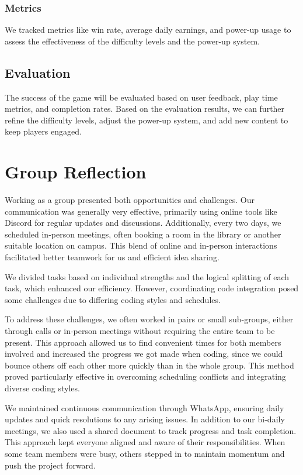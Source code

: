 \documentclass[9pt,a4paper,twoside]{tau-class/tau}
\begin{document}
    \subsubsection{Metrics}
    We tracked metrics like win rate, average daily earnings, and power-up usage to assess the effectiveness of the difficulty levels and the power-up system. 
    
    \subsection{Evaluation} 
    
    The success of the game will be evaluated based on user feedback, play time metrics, and completion rates. Based on the evaluation results, we can further refine the difficulty levels, adjust the power-up system, and add new content to keep players engaged. 

    \section{Group Reflection}
    Working as a group presented both opportunities and challenges. Our communication was generally very effective, primarily using online tools like Discord for regular updates and discussions. Additionally, every two days, we scheduled in-person meetings, often booking a room in the library or another suitable location on campus. This blend of online and in-person interactions facilitated better teamwork for us and efficient idea sharing.  

    We divided tasks based on individual strengths and the logical splitting of each task, which enhanced our efficiency. However, coordinating code integration posed some challenges due to differing coding styles and schedules. 
    
    To address these challenges, we often worked in pairs or small sub-groups, either through calls or in-person meetings without requiring the entire team to be present. This approach allowed us to find convenient times for both members involved and increased the progress we got made when coding, since we could bounce others off each other more quickly than in the whole group. This method proved particularly effective in overcoming scheduling conflicts and integrating diverse coding styles. 
    
    We maintained continuous communication through WhatsApp, ensuring daily updates and quick resolutions to any arising issues. In addition to our bi-daily meetings, we also used a shared document to track progress and task completion. This approach kept everyone aligned and aware of their responsibilities. When some team members were busy, others stepped in to maintain momentum and push the project forward. 
    
\end{document}
